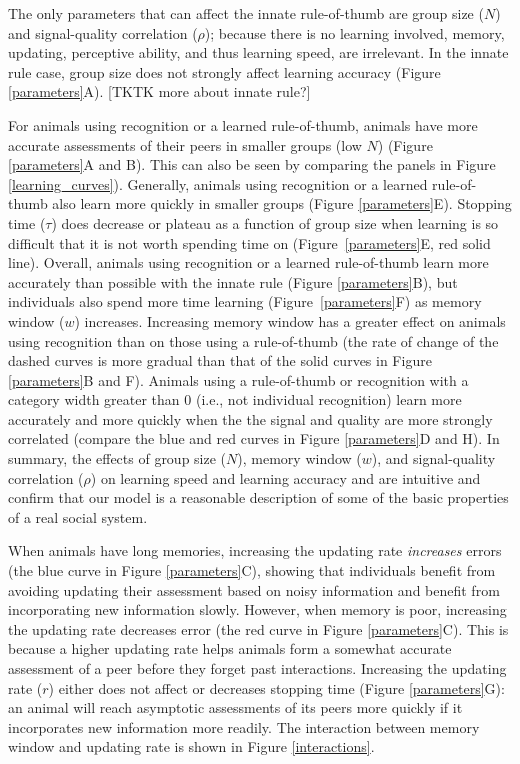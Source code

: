 The only parameters that can affect the innate rule-of-thumb are group size ($N$) and signal-quality correlation ($\rho$); because there is no learning involved, memory, updating, perceptive ability, and thus learning speed, are irrelevant. In the innate rule case, group size does not strongly affect learning accuracy (Figure \ref{parameters}A). [TKTK more about innate rule?]

For animals using recognition or a learned rule-of-thumb, animals have more accurate assessments of their peers in smaller groups (low $N$) (Figure \ref{parameters}A and B). This can also be seen by comparing the panels in Figure \ref{learning_curves}). Generally, animals using recognition or a learned rule-of-thumb also learn more quickly in smaller groups (Figure \ref{parameters}E). Stopping time ($\tau$) does decrease or plateau as a function of group size when learning is so difficult that it is not worth spending time on (Figure~\ref{parameters}E, red solid line). Overall, animals using recognition or a learned rule-of-thumb learn more accurately than possible with the innate rule (Figure \ref{parameters}B), but individuals also spend more time learning (Figure~\ref{parameters}F) as memory window ($w$) increases. Increasing memory window has a greater effect on animals using recognition than on those using a rule-of-thumb (the rate of change of the dashed curves is more gradual than that of the solid curves in Figure \ref{parameters}B and F).  Animals using a rule-of-thumb or recognition with a category width greater than $0$ (i.e., not individual recognition) learn more accurately and more quickly when the the signal and quality are more strongly correlated (compare the blue and red curves in Figure \ref{parameters}D and H). In summary, the effects of group size ($N$), memory window ($w$), and signal-quality correlation ($\rho$) on learning speed and learning accuracy and are intuitive and confirm that our model is a reasonable description of some of the basic properties of a real social system. 
 
When animals have long memories, increasing the updating rate \emph{increases} errors (the blue curve in Figure \ref{parameters}C), showing that individuals benefit from avoiding updating their assessment based on noisy information and benefit from incorporating new information slowly. However, when memory is poor, increasing the updating rate decreases error (the red curve in Figure \ref{parameters}C). This is because a higher updating rate helps animals form a somewhat accurate assessment of a peer before they forget past interactions. Increasing the updating rate ($r$) either does not affect or decreases stopping time (Figure \ref{parameters}G): an animal will reach asymptotic assessments of its peers more quickly if it incorporates new information more readily. The interaction between memory window and updating rate is shown in Figure \ref{interactions}.
 
